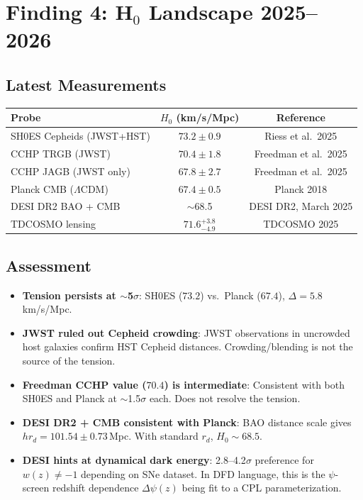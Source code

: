 \documentclass[11pt]{article}
\begin{document}
\section{Finding 4: H$_0$ Landscape 2025--2026}

\subsection{Latest Measurements}

\begin{table}[h]
\centering
\begin{tabular}{lcc}
\toprule
\textbf{Probe} & \textbf{$H_0$ (km/s/Mpc)} & \textbf{Reference} \\
\midrule
SH0ES Cepheids (JWST+HST) & $73.2 \pm 0.9$ & Riess et al.\ 2025 \\
CCHP TRGB (JWST) & $70.4 \pm 1.8$ & Freedman et al.\ 2025 \\
CCHP JAGB (JWST only) & $67.8 \pm 2.7$ & Freedman et al.\ 2025 \\
Planck CMB ($\Lambda$CDM) & $67.4 \pm 0.5$ & Planck 2018 \\
DESI DR2 BAO + CMB & $\sim$68.5 & DESI DR2, March 2025 \\
TDCOSMO lensing & $71.6^{+3.8}_{-4.9}$ & TDCOSMO 2025 \\
\bottomrule
\end{tabular}
\end{table}

\subsection{Assessment}

\begin{itemize}
\item \textbf{Tension persists at $\sim$5$\sigma$}: SH0ES ($73.2$) vs.\
  Planck ($67.4$), $\Delta = 5.8$\,km/s/Mpc.
\item \textbf{JWST ruled out Cepheid crowding}: JWST observations in
  uncrowded host galaxies confirm HST Cepheid distances.
  Crowding/blending is not the source of the tension.
\item \textbf{Freedman CCHP value ($70.4$) is intermediate}: Consistent
  with both SH0ES and Planck at $\sim$1.5$\sigma$ each. Does not resolve
  the tension.
\item \textbf{DESI DR2 + CMB consistent with Planck}: BAO distance
  scale gives $h r_d = 101.54 \pm 0.73$\,Mpc. With standard $r_d$,
  $H_0 \sim 68.5$.
\item \textbf{DESI hints at dynamical dark energy}: 2.8--4.2$\sigma$
  preference for $w(z) \neq -1$ depending on SNe dataset.
  In DFD language, this is the $\psi$-screen redshift dependence
  $\Delta\psi(z)$ being fit to a CPL parameterization.
\end{itemize}
\end{document}
